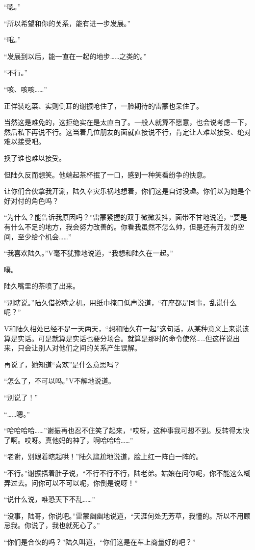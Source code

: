 “嗯。”

“所以希望和你的关系，能有进一步发展。”

“哦。”

“发展到以后，能一直在一起的地步……之类的。”

“不行。”

“咳、咳咳……”

正佯装吃菜、实则侧耳的谢振呛住了，一脸期待的雷蒙也呆住了。

当然这是难免的，这拒绝实在是太直白了。一般人就算不愿意，也会说考虑一下，然后私下再说不行。这当着几位朋友的面就直接说不行，肯定让人难以接受、绝对难以接受吧。

换了谁也难以接受。

但陆久反而想笑。他端起茶杯抿了一口，感到一种笑看纷争的快意。

让你们合伙拿我开涮，陆久幸灾乐祸地想着，你们这是自讨没趣。你们以为她是个好对付的角色吗？

“为什么？能告诉我原因吗？”雷蒙紧握的双手微微发抖，面带不甘地说道，“要是有什么不足的地方，我会努力改善的。你看我虽然不怎么帅，但是还有开发的空间，至少给个机会……”

“我喜欢陆久。”V毫不犹豫地说道，“我想和陆久在一起。”

噗。

陆久嘴里的茶喷了出来。

“别瞎说。”陆久借擦嘴之机，用纸巾掩口低声说道，“在座都是同事，乱说什么呢？”

V和陆久相处已经不是一天两天，“想和陆久在一起”这句话，从某种意义上来说该算是实话。可是就算是实话也要分场合。就算是那时的命令使然……但这样说出来，只会让别人对他们之间的关系产生误解。

再说了，她知道“喜欢”是什么意思吗？

“怎么了，不可以吗。”V不解地说道。

“别说了！”

“……嗯。”

“哈哈哈哈……”谢振再也忍不住笑了起来，“哎呀，这种事我可想不到。反转得太快了啊。哎呀。真他妈的神了，啊哈哈哈……”

“老谢，别跟着瞎起哄！”陆久尴尬地说道，脸上红一阵白一阵的。

“不行。”谢振捂着肚子说，“不行不行不行，陆老弟。姑娘在问你呢，你不能这么糊弄过去。问你可以不可以呢，你倒是说呀！”

“说什么说，唯恐天下不乱……”

“没事，陆哥，你说吧。”雷蒙幽幽地说道，“天涯何处无芳草，我懂的。所以不用顾忌我。你说了，我也就死心了。”

“你们是合伙的吗？”陆久叫道，“你们这是在车上商量好的吧？”


